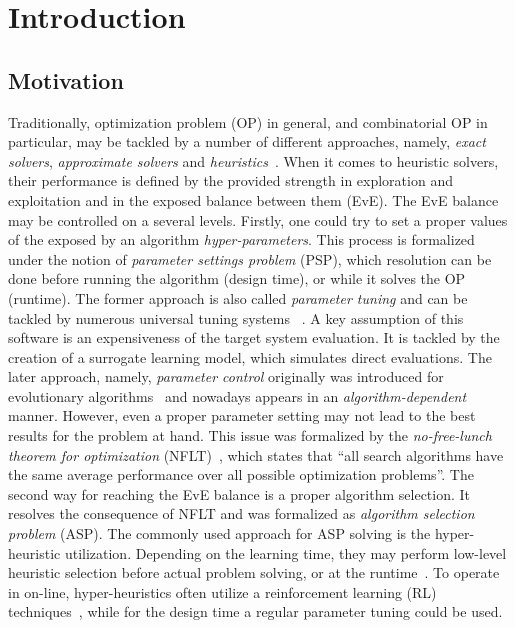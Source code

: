 \chapter{Introduction}\label{intro}

\section{Motivation}
Traditionally, optimization problem (OP) in general, and combinatorial OP in particular, may be tackled by a number of different approaches, namely, \emph{exact solvers}, \emph{approximate solvers} and \emph{heuristics}~\cite{junger2003combinatorial,biegler2004retrospective,festa2014brief}. When it comes to heuristic solvers, their performance is defined by the provided strength in exploration and exploitation and in the exposed balance between them (EvE). The EvE balance may be controlled on a several levels. Firstly, one could try to set a proper values of the exposed by an algorithm \emph{hyper-parameters}. This process is formalized under the notion of \emph{parameter settings problem} (PSP), which resolution can be done before running the algorithm (design time), or while it solves the OP (runtime). The former approach is also called \emph{parameter tuning} and can be tackled by numerous universal tuning systems ~\cite{hutter2009paramils,hutter2011sequential,lopez2016irace,falkner2018bohb,brise2spl}. A key assumption of this software is an expensiveness of the target system evaluation. It is tackled by the creation of a surrogate learning model, which simulates direct evaluations. The later approach, namely, \emph{parameter control} originally was introduced for evolutionary algorithms~\cite{karafotias2014parameter} and nowadays appears in an \emph{algorithm-dependent} manner. However, even a proper parameter setting may not lead to the best results for the problem at hand. This issue was formalized by the \emph{no-free-lunch theorem for optimization} (NFLT)~\cite{wolpert1997no}, which states that ``all search algorithms have the same average performance over all possible optimization problems''. The second way for reaching the EvE balance is a proper algorithm selection. It resolves the consequence of NFLT and was formalized as \emph{algorithm selection problem} (ASP). The commonly used approach for ASP solving is the hyper-heuristic utilization. Depending on the learning time, they may perform low-level heuristic selection before actual problem solving, or at the runtime~\cite{burke2019classification}. To operate in on-line, hyper-heuristics often utilize a reinforcement learning (RL) techniques~\cite{moriarty1999evolutionary,mcclymont2011markov}, while for the design time a regular parameter tuning could be used.

